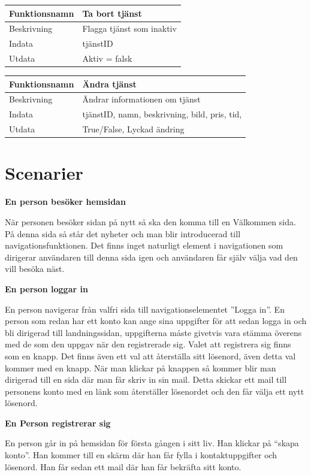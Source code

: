 \documentclass[11pt, titlepage, oneside, a4paper]{article}	%
\begin{document}
\begin{tabular}{ll}
\hline
Funktionsnamn & Ta bort tjänst              \\ \hline
Beskrivning   & Flagga tjänst som inaktiv \\ \hline
Indata        & tjänstID  \\ \hline
Utdata        & Aktiv = falsk  \\ \hline
\end{tabular}

\begin{tabular}{ll}
\hline
Funktionsnamn & Ändra tjänst              \\ \hline
Beskrivning   & Ändrar informationen om tjänst \\ \hline
Indata        & tjänstID, namn, beskrivning, bild, pris, tid,   \\ \hline
Utdata        & True/False, Lyckad ändring  \\ \hline
\end{tabular}


\newpage

\section{Scenarier}
\textbf {En person besöker hemsidan }

När personen besöker sidan på nytt så ska den komma till en Välkommen sida. På denna sida så står det nyheter och man blir introducerad till navigationsfunktionen.  Det finns inget naturligt element i navigationen som dirigerar användaren till denna sida igen och användaren får själv välja vad den vill besöka näst.

\textbf {En person loggar in}

En person navigerar från valfri sida till navigationselementet ”Logga in”. En person som redan har ett konto kan ange sina uppgifter för att sedan logga in och bli dirigerad till landningssidan, uppgifterna måste givetvis vara stämma överens med de som den uppgav när den registrerade sig. Valet att registrera sig finns som en knapp. Det finns även ett val att återställa sitt lösenord, även detta val kommer med en knapp. När man klickar på knappen så kommer blir man dirigerad till en sida där man får skriv in sin mail. Detta skickar ett mail till personens konto med en länk som återställer lösenordet och den får välja ett nytt lösenord.

\textbf {En Person registrerar sig}

En person går in på hemsidan för första gången i sitt liv. Han klickar på “skapa konto”. Han kommer till en skärm där han får fylla i kontaktuppgifter och lösenord. Han får sedan ett mail där han får bekräfta sitt konto.
\end{document}
